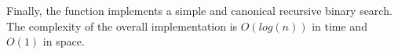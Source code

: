 Finally, the function  implements a simple and canonical recursive binary search. 
The complexity of the overall implementation is $O(log(n))$ in time and $O(1)$ in space.


